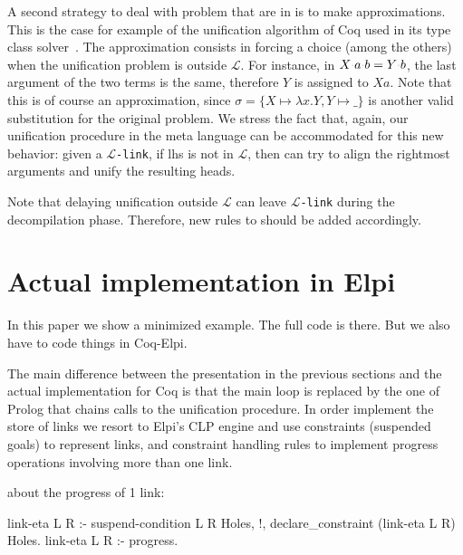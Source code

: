 \documentclass[sigconf,natbib=false,review]{acmart}
\newcommand{\appsep}{\ensuremath{\textcolor{lightgray}{\cdot}}}
\newcommand{\llambda}{\ensuremath{\mathcal{L}}\xspace}
\newcommand{\linkMacro}[1]{\ensuremath{#1}\texttt{-link}\xspace}
\newcommand{\linkbeta}{\linkMacro{\llambda}}
\newcommand{\lhs}{lhs\xspace}
\begin{document}
A second strategy to deal with problem that are in \notllambda is to make
approximations. This is the case for example of the unification algorithm of Coq
used in its type class solver~\cite{sozeau08}. The approximation consists in
forcing a choice (among the others) when the unification problem is outside
\llambda. For instance, in $X \appsep a \appsep b = Y \appsep b$, the last
argument of the two terms is the same, therefore $Y$ is assigned to $X a$. Note
that this is of course an approximation, since $\sigma = \{X \mapsto \lambda x.Y, Y \mapsto
\_\}$ is another valid substitution for the original problem. We stress the 
fact that, again, our unification procedure in the meta language can be 
accommodated for this new behavior: given a \linkbeta, if \lhs is not in \llambda,
then  can try to align the rightmost arguments and unify
the resulting heads. 

Note that delaying unification outside \llambda can leave \linkbeta during the
decompilation phase. Therefore, new rules to  should
be added accordingly.



\section{Actual implementation in Elpi}\label{sec:implementation}

In this paper we show a minimized example. The full code is there.
But we also have to code things in Coq-Elpi.

The main difference between the presentation in the previous sections and
the actual implementation for Coq is that the main loop \hrun is replaced by
the one of Prolog that chains calls to the unification procedure. In order
implement the store of links we resort to Elpi's CLP engine and
use constraints (suspended goals) to represent links, and constraint
handling rules to implement progress operations involving more than one link.

about the progress of 1 link:

\begin{elpicode}
link-eta L R :- suspend-condition L R Holes, !,
  declare_constraint (link-eta L R) Holes.
link-eta L R :-
  progress. %
\end{elpicode}
\end{document}
